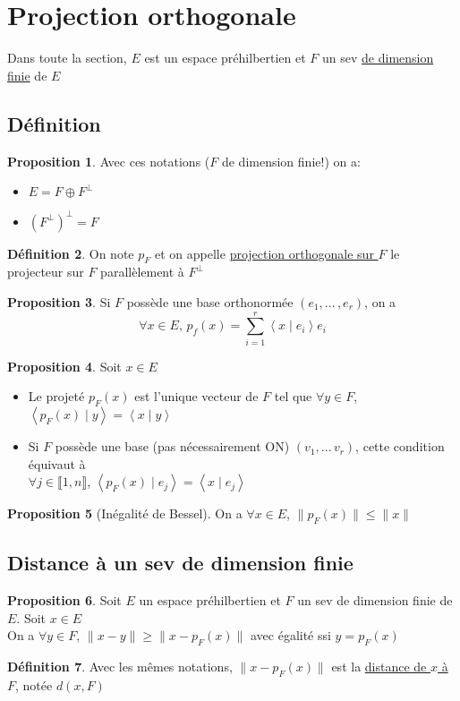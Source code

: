 \documentclass[10pt,a4paper]{article}
\theoremstyle{definition}
\newtheorem{proposition}{Proposition}[section]
\newtheorem{definition}[proposition]{Définition}
\newcommand{\vp}[2]{\left< #1 \mid #2 \right>}
\begin{document}
\pagebreak

\section{Projection orthogonale}
Dans toute la section, $E$ est un espace préhilbertien et $F$ un sev \uline{de dimension finie} de $E$
\subsection{Définition}
\begin{proposition}
Avec ces notations ($F$ de dimension finie!) on a:
\begin{itemize}
\item $E = F \oplus F^\perp$
\item $\left(F^\perp\right)^\perp = F$
\end{itemize}
\end{proposition}
\begin{definition}
On note $p_F$ et on appelle \uline{projection orthogonale sur $F$} le projecteur sur $F$ parallèlement à $F^\perp$
\end{definition}
\begin{proposition}
Si $F$ possède une base orthonormée $(e_1, ...\,, e_r)$, on a 
\[\forall x \in E ,\, p_f(x) = \sum\limits_{i = 1}^r \vp{x}{e_i} e_i \]
\end{proposition}
\begin{proposition}
Soit $x \in E$
\begin{itemize}
\item Le projeté $p_F(x)$ est l'unique vecteur de $F$ tel que $\forall y \in F$, $\vp{p_F(x)}{y} = \vp{x}{y}$
\item Si $F$ possède une base (pas nécessairement ON) $(v_1, ...\, v_r)$, cette condition équivaut à \\
$\forall j \in \llbracket 1, n \rrbracket$, $\vp{p_F(x)}{e_j} = \vp{x}{e_j}$
\end{itemize}
\end{proposition}
\begin{proposition}[Inégalité de Bessel]
On a $\forall x \in E$, $\lVert p_F(x) \rVert \leq \lVert x \rVert$
\end{proposition}

\subsection{Distance à un sev de dimension finie}
\begin{proposition}
Soit $E$ un espace préhilbertien et $F$ un sev de dimension finie de $E$. Soit $x \in E$ \\
On a $\forall y \in F$, $\lVert x - y \rVert \geq \lVert x - p_F(x) \rVert$ avec égalité ssi $y = p_F(x)$
\end{proposition}
\begin{definition}
Avec les mêmes notations, $\lVert x - p_F(x) \rVert$ est la \uline{distance de $x$ à $F$}, notée $d(x, F)$
\end{definition}
\end{document}
